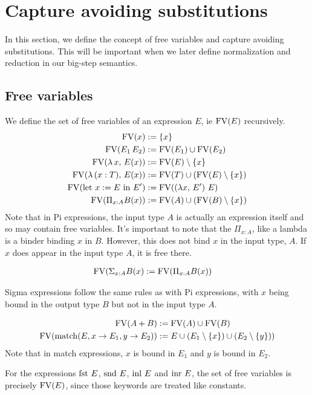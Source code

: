 \documentclass{article}
\begin{document}
\section{Capture avoiding substitutions}
In this section, we define the concept of free variables and capture avoiding
substitutions. This will be important when we later define normalization and
reduction in our big-step semantics.

\subsection{Free variables}
We define the set of free variables of an expression $E$, ie $\operatorname{FV}(E)$ recursively.
\begin{align*}
  \operatorname{FV} (x) &:= \{x\} \\
  \operatorname{FV} (E_1 \, E_2) &:= \operatorname{FV}(E_1) \cup \operatorname{FV}(E_2) \\
  \operatorname{FV} (\lambda \, x, \, E(x)) &:= \operatorname{FV}(E) \setminus \{x\} \\
  \operatorname{FV} (\lambda \, (x : T), \, E(x)) &:= \operatorname{FV}(T) \cup (\operatorname{FV}(E) \setminus \{x\}) \\
  \operatorname{FV} (\text{let } x := E \text{ in } E') &:= \operatorname{FV}((\lambda x, \, E') \,\, E) \\
  \operatorname{FV} (\Pi_{x : A} B(x)) &:= \operatorname{FV}(A) \cup (\operatorname{FV}(B) \setminus \{x\})
\end{align*}
Note that in Pi expressions, the input type $A$ is actually an expression itself
and so may contain free variables. It's important to note that the $\Pi_{x :
  A}$, like a lambda is a binder binding $x$ in $B$. However, this does not bind
$x$ in the input type, $A$. If $x$ does appear in the input type $A$, it is
free there.

\begin{align*}
 \operatorname{FV} (\Sigma_{x : A} B(x) &:= \operatorname{FV}(\Pi_{x : A} B(x))
\end{align*}

Sigma expressions follow the same rules as with Pi expressions, with $x$ being
bound in the output type $B$ but not in the input type $A$.

\begin{align*}
  \operatorname{FV} (A + B) &:= \operatorname{FV}(A) \cup \operatorname{FV}(B) \\
  \operatorname{FV} (\operatorname{match}(E, x \rightarrow E_1, y \rightarrow E_2)) &:= 
    E \cup (E_1 \setminus \{x\}) \cup (E_2 \setminus \{y\}))
\end{align*}
Note that in match expressions, $x$ is bound in $E_1$ and $y$ is bound in $E_2$.

For the expressions $\operatorname{fst} \, E$, $\operatorname{snd} \, E$, $\operatorname{inl} \, E$ and $\operatorname{inr} \, E$, the
set of free variables is precisely $\operatorname{FV}(E)$, since those keywords are treated
like constants.
\end{document}
